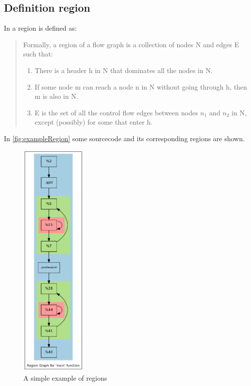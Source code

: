 \subsection{Definition region}
In \cite[chapter 9.7.1, p.~672]{Drachenbuch} a region is defined as:

\begin{quote}
    Formally, a region of a flow graph is a collection of nodes N and edges E such that:
    \begin{enumerate}
        \item There is a header h in N that dominates all the nodes in N.
        \item If some node m can reach a node n in N without going through h, then m is also in N.
        \item E is the set of all the control flow edges between nodes \(n_1\) and \(n_2\) in N, except (possibly) for some that enter h.
    \end{enumerate}
\end{quote}
In \autoref{fig:exampleRegion} some sourcecode and its corresponding regions are shown.
\begin{figure}
    \caption{A simple example of regions}
    \label{fig:exampleRegion}
    \begin{minipage}{.7\textwidth}
        
    \end{minipage}
    \begin{minipage}{.2\textwidth}
        \includegraphics[height=12cm]{gfx/matmulRegions.png}
    \end{minipage}
\end{figure}
